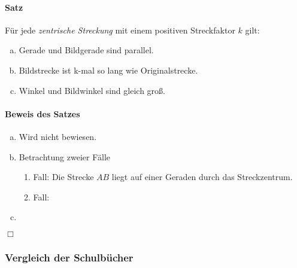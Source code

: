 \documentclass[11pt]{article}
\let\marginpar\marginnote
\begin{document}
\paragraph{Satz}
Für jede \textit{zentrische Streckung} mit einem positiven Streckfaktor $ k $ gilt:
\begin{enumerate}[(a)]
	\item Gerade und Bildgerade sind parallel.
	\item Bildstrecke ist k-mal so lang wie Originalstrecke.
	\item Winkel und Bildwinkel sind gleich groß.
\end{enumerate}
\paragraph{Beweis des Satzes}
\begin{enumerate}[(a)]
	\item Wird nicht bewiesen.
	\item Betrachtung zweier Fälle
	\begin{enumerate}
		\item Fall: Die Strecke $ AB $ liegt auf einer Geraden durch das Streckzentrum. \marginpar{$ Z \in A\lor B $}
		\item Fall:
	\end{enumerate}
	\item 
\end{enumerate}
\begin{flushright}
	$ \Box $
\end{flushright}
\subsubsection*{Vergleich der Schulbücher}
\end{document}
